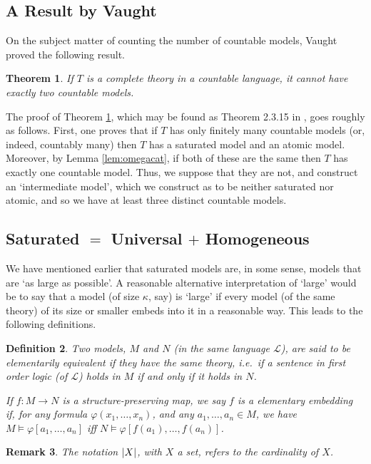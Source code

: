 \documentclass{article}
\newtheorem{theorem}{Theorem}[section]
\newtheorem{remark}[theorem]{Remark}
\newtheorem{definition}[theorem]{Definition}
\theoremstyle{nonumberplain}
\newcommand{\Lang}{\mathcal{L}}
\DeclarePairedDelimiter{\card}{\lvert}{\rvert}
\begin{document}
\subsection{A Result by Vaught}\label{sec:vaught}

On the subject matter of counting the number of countable models, Vaught proved the following result.

\begin{theorem}\label{thm:vaught}
If $T$ is a complete theory in a countable language, it cannot have exactly two countable models.
\end{theorem}

The proof of Theorem \ref{thm:vaught}, which may be found as Theorem 2.3.15 in \cite{cnk}, goes roughly as follows. First, one proves that if $T$ has only finitely many countable models (or, indeed, countably many) then $T$ has a saturated model and an atomic model. Moreover, by Lemma \ref{lem:omegacat}, if both of these are the same then $T$ has exactly one countable model. Thus, we suppose that they are not, and construct an `intermediate model', which we construct as to be neither saturated nor atomic, and so we have at least three distinct countable models.

\subsection{Saturated $=$ Universal $+$ Homogeneous}

We have mentioned earlier that saturated models are, in some sense, models that are `as large as possible'. A reasonable alternative interpretation of `large'  would be to say that a model (of size $\kappa$, say) is `large' if every model (of the same theory) of its size or smaller embeds into it in a reasonable way. This leads to the following definitions.
\begin{definition}
Two models, $M$ and $N$ (in the same language $\Lang$), are said to be \emph{elementarily equivalent} if they have the same theory, i.e.\ if a sentence in first order logic (of $\Lang$) holds in $M$ if and only if it holds in $N$.

If $f \colon M \to N$ is a structure-preserving map, we say $f$ is a \emph{elementary embedding} if, for any formula $\varphi(x_1, \dots, x_n)$, and any $a_1, \dots, a_n \in M$, we have $M \vDash \varphi[a_1, \dots, a_n]$ iff $N \vDash \varphi[f(a_1),\dots,f(a_n)]$.
\end{definition}

\begin{remark}
The notation $\card X$, with $X$ a set, refers to the cardinality of $X$.
\end{remark}
\end{document}
